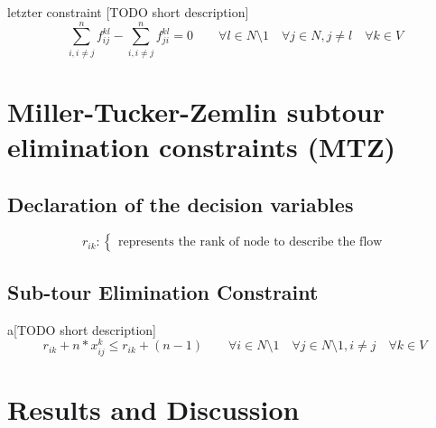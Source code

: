 \documentclass[a4paper]{article}
\begin{document}
letzter constraint [TODO short description]
\begin{equation}
\sum_{i, i \neq j}^n f_{ij}^{kl} - \sum_{i, i \neq j}^n f_{ji}^{kl} = 0		 \quad 
\quad \forall l \in N \setminus {1}
\quad \forall j \in N , j \neq l
\quad \forall k \in V 
\end{equation}


\section*{Miller-Tucker-Zemlin subtour elimination constraints (MTZ)}\subsection*{Declaration of the decision variables}
\begin{equation*}
r_{ik} : 
	\begin{cases}
	\text{represents the rank of node to describe the flow}
	\end{cases}
\end{equation*}

\subsection*{Sub-tour Elimination Constraint}
a[TODO short description]
\begin{equation}
r_{ik} + n * x_{ij}^k \leq r_{ik} + (n - 1) \quad 
\quad \forall i \in N \setminus {1}
\quad \forall j \in N \setminus {1} , i \neq j
\quad \forall k \in V 
\end{equation}

\section*{Results and Discussion}
\end{document}
